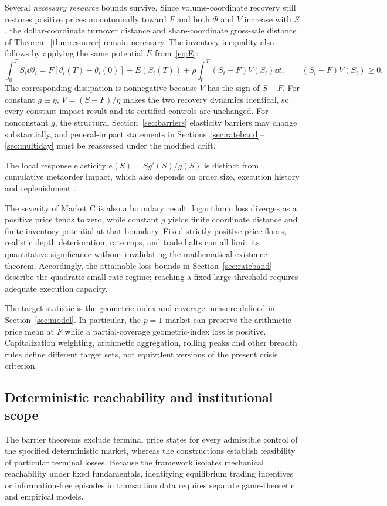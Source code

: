 \documentclass[review,hidelinks,onefignum,onetabnum]{siamonline250211}
\begin{document}
Several \emph{necessary resource} bounds survive.
Since volume-coordinate recovery still restores
positive prices monotonically toward $F$ and
both $\Phi$ and $V$ increase with $S$,
the dollar-coordinate turnover distance
and share-coordinate gross-sale distance of
Theorem~\ref{thm:resource} remain necessary.
The inventory inequality also follows by applying
the same potential $E$ from~\eqref{eq:E}:
\[
\int_0^T S_i\dd\theta_i
=F[\theta_i(T)-\theta_i(0)]+E(S_i(T))
+\rho\int_0^T(S_i-F)V(S_i)\dd t,\qquad
(S_i-F)V(S_i)\ge0.
\]
The corresponding dissipation is nonnegative
because $V$ has the sign of $S-F$.
For constant $g\equiv\eta$,
$V=(S-F)/\eta$ makes the two recovery
dynamics identical, so every constant-impact
result and its certified controls are unchanged.
For nonconstant $g$, the structural
Section~\ref{sec:barriers} elasticity barriers
may change substantially, and general-impact
statements in Sections~\ref{sec:rateband}--\ref{sec:multiday}
must be reassessed under the modified drift.

The local response elasticity $e(S)=Sg'(S)/g(S)$
is distinct from cumulative metaorder impact,
which also depends on order size, execution history
and replenishment
\citep{AlfonsiFruthSchied2010,BucciEtAl2019,CuratoGatheralLillo2017}.

The severity of Market C is also a boundary result: logarithmic loss diverges as a positive price tends to zero, while constant $g$ yields finite coordinate distance and finite inventory potential at that boundary. Fixed strictly positive price floors, realistic depth deterioration, rate caps, and trade halts can all limit its quantitative significance without invalidating the mathematical existence theorem. Accordingly, the attainable-loss bounds in Section~\ref{sec:rateband} describe the quadratic small-rate regime; reaching a fixed large threshold requires adequate execution capacity.

The target statistic is the geometric-index
and coverage measure defined in Section~\ref{sec:model}.
In particular, the $p=1$ market can preserve
the arithmetic price mean at $F$ while a
partial-coverage geometric-index loss is positive.
Capitalization weighting, arithmetic aggregation,
rolling peaks and other breadth rules define
different target sets, not equivalent versions
of the present crisis criterion.

\subsection{Deterministic reachability and institutional scope}
The barrier theorems exclude terminal price states for every admissible
control of the specified deterministic market, whereas the
constructions establish feasibility of particular terminal losses.
Because the framework isolates mechanical reachability under fixed
fundamentals, identifying equilibrium trading incentives or
information-free episodes in transaction data requires separate
game-theoretic and empirical models.
\end{document}
